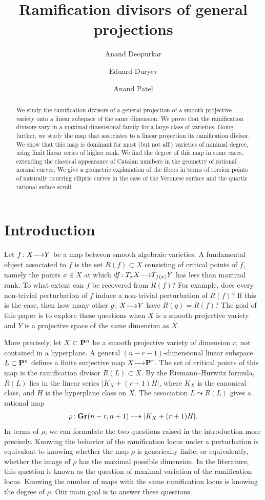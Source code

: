 \documentclass[11pt,reqno]{amsart}
\title[Projection and ramification]{Ramification divisors of general projections}
\author[Deopurkar, Duryev, Patel]{Anand Deopurkar \and Eduard Duryev \and  Anand Patel}
\theoremstyle{plain}
\theoremstyle{definition}
\theoremstyle{remark}
\numberwithin{equation}{section}
\renewcommand{\to}{{\longrightarrow}}
\numberwithin{equation}{section}
\begin{document}
\begin{abstract}
  We study the ramification divisors of a general projection of a smooth projective variety onto a linear subspace of the same dimension.
  We prove that the ramification divisors vary in a maximal dimensional family for a large class of varieties.
  Going further, we study the map that associates to a linear projection its ramification divisor.
  We show that this map is dominant for most (but not all!) varieties of minimal degree, using limit linear series of higher rank.
  We find the degree of this map in some cases, extending the classical appearance of Catalan numbers in the geometry of rational normal curves.
  We give a geometric explanation of the fibers in terms of torsion points of naturally ocurring elliptic curves in the case of the Veronese surface and the quartic rational suface scroll.
\end{abstract}


\maketitle

\section{Introduction}\label{sec:intro}
Let $f \from X \to Y$ be a map between smooth algebraic varieties.
A fundamental object associated to $f$ is the set $R(f) \subset X$ consisting of critical points of $f$, namely the points $x \in X$ at which $df \from T_xX \to T_{f(x)}Y$ has less than maximal rank.
To what extent can $f$ be recovered from $R(f)$?
For example, does every non-trivial perturbation of $f$ induce a non-trivial perturbation of $R(f)$?
If this is the case, then how many other $g \from X \to Y$ have $R(g) = R(f)$?
The goal of this paper is to explore these questions when $X$ is a smooth projective variety and $Y$ is a projective space of the same dimension as $X$.

More precisely, let $X \subset \P^n$ be a smooth projective variety of dimension $r$, not contained in a hyperplane.
A general $(n-r-1)$-dimensional linear subspace $L \subset \P^n$ defines a finite surjective map $X \to \P^r$.
The set of critical points of this map is the ramification divisor $R(L) \subset X$.
By the Riemann--Hurwitz formula, $R(L)$ lies in the linear series $|K_X + (r+1)H|$, where $K_X$ is the canonical class, and $H$ is the hyperplane class on $X$.
The association $L \leadsto R(L)$ gives a rational map
\[
  \rho \from \Gr(n-r, n+1) \dashrightarrow |K_X + (r+1)H|.
\]
In terms of $\rho$, we can formulate the two questions raised in the introduction more precisely.
Knowing the behavior of the ramification locus under a perturbation is equivalent to knowing whether the map $\rho$ is generically finite, or equivalently, whether the image of $\rho$ has the maximal possible dimension.
In the literature, this question is known as the question of maximal variation of the ramification locus.
Knowing the number of maps with the same ramification locus is knowing the degree of $\rho$.
Our main goal is to answer these questions.
\end{document}
